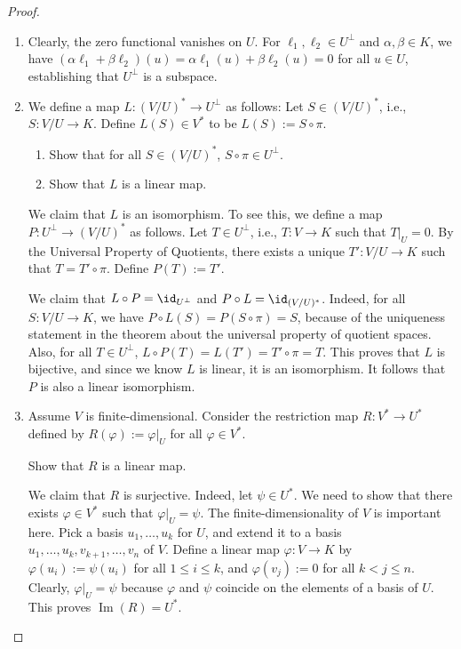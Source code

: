\begin{proof}
  \begin{enumerate}
    \item Clearly, the zero functional vanishes on $U$. For $\ell_1, \ell_2 \in U^\perp$ and $\alpha, \beta \in K$, we have $(\alpha \ell_1 + \beta \ell_2)(u) = \alpha \ell_1(u) + \beta \ell_2(u) = 0$ for all $u \in U$, establishing that $U^\perp$ is a subspace.

    \item We define a map $L \colon (V/U)^* \to U^\perp$ as follows: Let $S \in (V/U)^*$, i.e., $S \colon V/U \to K$. Define $L(S) \in V^*$ to be $L(S) := S \circ \pi$.

    \begin{exercise}
      \begin{enumerate}
        \item Show that for all $S \in (V/U)^*$, $S \circ \pi \in U^\perp$.
        \item Show that $L$ is a linear map.
      \end{enumerate}
    \end{exercise}
    
    We claim that $L$ is an isomorphism. To see this, we define a map $P \colon U^\perp \to (V/U)^*$ as follows. Let $T \in U^\perp$, i.e., $T \colon V \to K$ such that $T|_U = 0$. By the Universal Property of Quotients, there exists a unique $T' \colon V/U \to K$ such that $T = T' \circ \pi$. Define $P(T) := T'$.

    We claim that $L \circ P = \id_{U^\perp}$ and $P \circ L = \id_{(V/U)^*}$. Indeed, for all $S \colon V/U \to K$, we have $P \circ L(S) = P(S \circ \pi) = S$, because of the uniqueness statement in the theorem about the universal property of quotient spaces. Also, for all $T \in U^\perp$, $L \circ P(T) = L(T') = T' \circ \pi = T$. This proves that $L$ is bijective, and since we know $L$ is linear, it is an isomorphism. It follows that $P$ is also a linear isomorphism.

    \item Assume $V$ is finite-dimensional. Consider the restriction map $R \colon V^* \to U^*$ defined by $R(\varphi) := \varphi|_U$ for all $\varphi \in V^*$. 

    \begin{exercise}
      Show that $R$ is a linear map.
    \end{exercise}

    We claim that $R$ is surjective. Indeed, let $\psi \in U^*$. We need to show that there exists $\varphi \in V^*$ such that $\varphi|_U = \psi$. The finite-dimensionality of $V$ is important here. Pick a basis $u_1, \dots, u_k$ for $U$, and extend it to a basis $u_1, \dots, u_k, v_{k+1}, \dots, v_n$ of $V$. Define a linear map $\varphi \colon V \to K$ by $\varphi(u_i) := \psi(u_i)$ for all $1 \leq i \leq k$, and $\varphi(v_j) := 0$ for all $k < j \leq n$. Clearly, $\varphi|_U = \psi$ because $\varphi$ and $\psi$ coincide on the elements of a basis of $U$. This proves $\operatorname{Im}(R) = U^*$.


\end{enumerate}
\end{proof}
